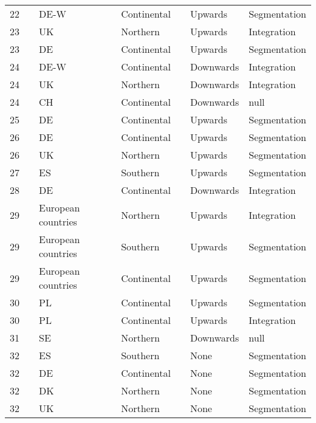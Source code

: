 \begin{longtable}{l>{\raggedright\arraybackslash}p{1.2in}>{\raggedright\arraybackslash}p{.9in}>{\raggedright\arraybackslash}p{.9in}>{\raggedright\arraybackslash}p{1.2in}ll}
   22 & \citealp{gebel_2009} & DE-W & Continental &  & Upwards & Segmentation \\ 
   23 & \citealp{gebel_2010} & UK & Northern &  & Upwards & Integration \\ 
   23 & \citealp{gebel_2010} & DE & Continental &  & Upwards & Segmentation \\ 
   24 & \citealp{gebel_2013} & DE-W & Continental &  & Downwards & Integration \\ 
   24 & \citealp{gebel_2013} & UK & Northern &  & Downwards & Integration \\ 
   24 & \citealp{gebel_2013} & CH & Continental &  & Downwards & null \\ 
   25 & \citealp{giesecke_gross_2003} & DE & Continental &  & Upwards & Segmentation \\ 
   26 & \citealp{giesecke_gross_2004} & DE & Continental &  & Upwards & Segmentation \\ 
   26 & \citealp{giesecke_gross_2004} & UK & Northern &  & Upwards & Segmentation \\ 
   27 & \citealp{guell_petrongolo_2007} & ES & Southern &  & Upwards & Segmentation \\ 
   28 & \citealp{hagen_2002} & DE & Continental &  & Downwards & Integration \\ 
   29 & \citealp{hogberg_etal_2019} & 18 European countries & Northern &  & Upwards & Integration \\ 
   29 & \citealp{hogberg_etal_2019} & 18 European countries & Southern &  & Upwards & Segmentation \\ 
   29 & \citealp{hogberg_etal_2019} & 18 European countries & Continental &  & Upwards & Segmentation \\ 
   30 & \citealp{kiersztyn_2016} & PL & Continental &  & Upwards & Segmentation \\ 
   30 & \citealp{kiersztyn_2016} & PL & Continental &  & Upwards & Integration \\ 
   31 & \citealp{korpi_levin_2001} & SE & Northern &  & Downwards & null \\ 
   32 & \citealp{leschke_2009} & ES & Southern &  & None & Segmentation \\ 
   32 & \citealp{leschke_2009} & DE & Continental &  & None & Segmentation \\ 
   32 & \citealp{leschke_2009} & DK & Northern &  & None & Segmentation \\ 
   32 & \citealp{leschke_2009} & UK & Northern &  & None & Segmentation \\ 

\end{longtable}

